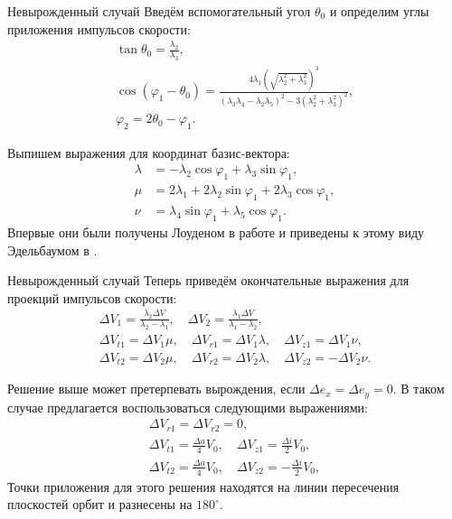 \documentclass[9pt]{beamer}
\begin{document}
\begin{frame}{Невырожденный случай}
Введём вспомогательный угол $\theta_0$ и определим углы приложения импульсов скорости:
\begin{gather*}
    \tan \theta_0 = \frac{\lambda_2}{\lambda_3}, \\
    \cos (\varphi_1 - \theta_0) = \frac{4 \lambda_1 \left( \sqrt{\lambda_2^2 + \lambda_3^2} \right)^3}{(\lambda_3 \lambda_4 - \lambda_2 \lambda_5)^2 - 3 \left( \lambda_2^2 + \lambda_3^2 \right)^2}, \\
    \varphi_2 = 2\theta_0 - \varphi_1.
\end{gather*}

Выпишем выражения для координат базис-вектора:
\begin{align*}
    \lambda &= - \lambda_2 \cos \varphi_1 + \lambda_3 \sin \varphi_1, \\
    \mu &= 2 \lambda_1 + 2 \lambda_2 \sin \varphi_1 + 2 \lambda_3 \cos \varphi_1, \\
    \nu &= \lambda_4 \sin \varphi_1 + \lambda_5 \cos \varphi_1.
\end{align*}
Впервые они были получены Лоуденом в работе \cite{Lawden_all} и приведены к этому виду Эдельбаумом в \cite{Edelbaum_1}.
\end{frame}

\begin{frame}{Невырожденный случай}
Теперь приведём окончательные выражения для проекций импульсов скорости:
\begin{gather*}
    \Delta V_1 = \frac{\lambda_2 \Delta V}{\lambda_2 - \lambda_1}, \quad \Delta V_2 = \frac{\lambda_1 \Delta V}{\lambda_1 - \lambda_2}, \\
    \Delta V_{t1} = \Delta V_1 \mu, \quad \Delta V_{r1} = \Delta V_1 \lambda, \quad \Delta V_{z1} = \Delta V_1 \nu, \\
    \Delta V_{t2} = \Delta V_2 \mu, \quad \Delta V_{r2} = \Delta V_2 \lambda, \quad \Delta V_{z2} = -\Delta V_2 \nu.
\end{gather*}

Решение выше может претерпевать вырождения, если $\Delta e_x = \Delta e_y = 0$. В таком случае предлагается воспользоваться следующими выражениями:
\begin{gather*}
    \Delta V_{r1} = \Delta V_{r2} = 0, \\
    \Delta V_{t1} = \frac{\Delta a}{4} V_0, \quad \Delta V_{z1} = \frac{\Delta i}{2} V_0, \\
    \Delta V_{t2} = \frac{\Delta a}{4} V_0, \quad \Delta V_{z2} = - \frac{\Delta i}{2} V_0,
\end{gather*}
Точки приложения для этого решения находятся на линии пересечения плоскостей орбит и разнесены на $180^{\circ}$.
\end{frame}
\end{document}
